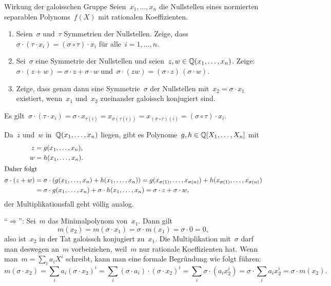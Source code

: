 \documentclass{algblatt}
\begin{document}
\vspace*{-1.5cm}

\begin{aufgabe}{Wirkung der galoisschen Gruppe}
Seien~$x_1,\ldots,x_n$ die Nullstellen eines normierten separablen
Polynoms~$f(X)$ mit rationalen Koeffizienten.
\begin{enumerate}
\item Seien~$\sigma$ und~$\tau$ Symmetrien der Nullstellen. Zeige, dass~$\sigma \cdot
(\tau \cdot x_i) = (\sigma \circ \tau) \cdot x_i$ für alle~$i = 1,\ldots,n$.

\item Sei~$\sigma$ eine Symmetrie der Nullstellen und seien~$z, w \in
\mathbb{Q}(x_1,\ldots,x_n)$. Zeige: $\sigma \cdot (z + w) = \sigma \cdot z + \sigma
\cdot w$ und~$\sigma \cdot (zw) = (\sigma \cdot z) \, (\sigma \cdot w)$.

\item Zeige, dass genau dann eine Symmetrie~$\sigma$ der Nullstellen
mit~$x_2 = \sigma \cdot x_1$ existiert, wenn~$x_1$ und~$x_2$ zueinander
galoissch konjugiert sind.
\end{enumerate}

\begin{loesungE}
\item Es gilt~$\sigma \cdot (\tau \cdot x_i) = \sigma \cdot x_{\tau(i)} =
x_{\sigma(\tau(i))} = x_{(\sigma \circ \tau)(i)} = (\sigma \circ \tau) \cdot
x_i$.

\item Da~$z$ und~$w$ in~$\mathbb{Q}(x_1,\ldots,x_n)$ liegen, gibt es Polynome~$g, h
\in \mathbb{Q}[X_1,\ldots,X_n]$ mit
\begin{align*}
  z &= g(x_1,\ldots,x_n), \\
  w &= h(x_1,\ldots,x_n). \\
\intertext{Daher folgt}
  \sigma \cdot (z+w) &= \sigma \cdot (g(x_1,\ldots,x_n) + h(x_1,\ldots,x_n)) =
  g(x_{\sigma(1)},\ldots,x_{\sigma(n)}) + h(x_{\sigma(1)},\ldots,x_{\sigma(n)})
  \\
  &=
  \sigma \cdot g(x_1,\ldots,x_n) + \sigma \cdot h(x_1,\ldots,x_n) =
  \sigma \cdot z + \sigma \cdot w,
\end{align*}
der Multiplikationsfall geht völlig analog.

\item "`$\Rightarrow$"': Sei~$m$ das Minimalpolynom von~$x_1$. Dann gilt
\[ m(x_2) = m(\sigma \cdot x_1) = \sigma \cdot m(x_1) = \sigma \cdot 0 = 0, \]
also ist~$x_2$ in der Tat galoissch konjugiert zu~$x_1$.
Die Multiplikation mit~$\sigma$ darf man deswegen an~$m$ vorbeiziehen, weil~$m$
nur rationale Koeffizienten hat. Wenn man~$m = \sum_i a_i X^i$ schreibt, kann
man eine formale Begründung wie folgt führen:
\[ m(\sigma \cdot x_2) =
  \sum_i a_i (\sigma \cdot x_2)^i =
  \sum_i (\sigma \cdot a_i) \cdot (\sigma \cdot x_2)^i =
  \sum_i \sigma \cdot (a_i x_2^i) =
  \sigma \cdot \sum_i a_i x_2^i =
  \sigma \cdot m(x_2). \]
\end{loesungE}
\end{aufgabe}
\end{document}
